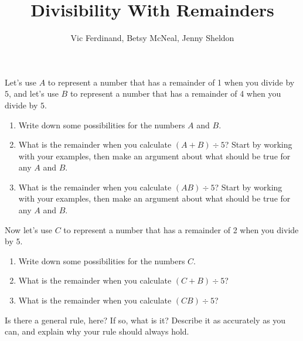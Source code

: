 \documentclass{ximera}
\title{Divisibility With Remainders}
\author{Vic Ferdinand, Betsy McNeal, Jenny Sheldon}
\begin{document}
\begin{abstract} \end{abstract}
\maketitle



\begin{problem} Let's use $A$ to represent a number that has a remainder of 1 when you divide by $5$, and let's use $B$ to represent a number that has a remainder of 4 when you divide by $5$.
\begin{enumerate}
\item Write down some possibilities for the numbers $A$ and $B$.
\item  What is the remainder when you calculate $(A + B) \div 5$?  Start by working with your examples, then make an argument about what should be true for any $A$ and $B$.
\item  What is the remainder when you calculate $(AB) \div 5$?  Start by working with your examples, then make an argument about what should be true for any $A$ and $B$.
\end{enumerate}
\end{problem}

\begin{problem}
Now let's use $C$ to represent a number that has a remainder of 2 when you divide by $5$.
\begin{enumerate}
\item  Write down some possibilities for the numbers $C$.
\item   What is the remainder when you calculate $(C + B) \div 5$?  
\item  What is the remainder when you calculate $(CB) \div 5$?
\end{enumerate}
\end{problem}

\begin{problem}
  Is there a general rule, here?  If so, what is it?  Describe it as accurately as you can, and explain why your rule should always hold.
\end{problem}
\end{document}
